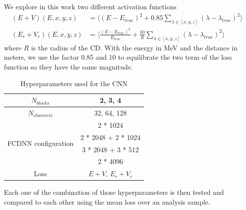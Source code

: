 We explore in this work two different activation functions
\begin{align}
  (E+V)(E, x, y, z) &= \bigg\langle (E - E_{true})^2 + 0.85 \sum_{\lambda \in [x, y, z]} (\lambda - \lambda_{true})^2 \bigg\rangle \\
  (E_r + V_r)(E, x, y, z) &=  \bigg\langle \frac{(E - E_{true}) ^ 2}{E_{true}} + \frac{10}{R} \sum_{\lambda \in [x, y, z]} (\lambda - \lambda_{true})^2 \bigg\rangle
\end{align}
where $R$ is the radius of the CD. With the energy in MeV and the distance in meters, we use the factor 0.85 and 10 to equilibrate the two term of the loss function so they have the same magnitude.

\begin{table}[ht]
  \centering
  \begin{tabular}{ | c | c | }
    \hline $N_{blocks}$ & {2, 3, 4} \\
    \hline $N_{channels}$ & {32, 64, 128} \\
    \hline
    \multirow{4}{*}{FCDNN configuration} & 2 * 1024 \\
                                        & 2 * 2048 + 2 * 1024 \\
                                        & 3 * 2048 + 3 * 512 \\
                                        & 2 * 4096 \\
    \hline
    Loss & $E+V$, $E_r + V_r$ \\
    \hline
  \end{tabular}
  \caption{Hyperparameters used for the CNN}
  \label{tab:jcnn:hyper}
\end{table}

Each one of the combination of those hyperparameters is then tested and compared to each other using the mean loss over an analysis sample.

